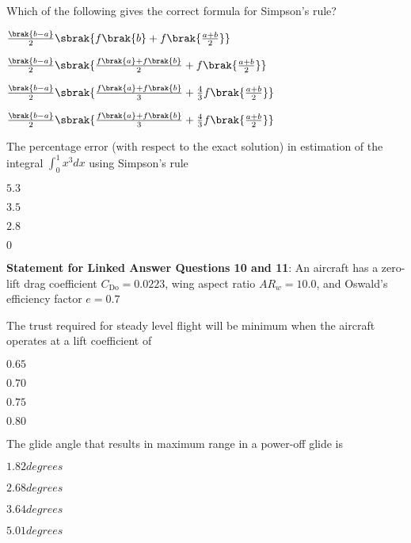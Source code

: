 \item Which of the following gives the correct formula for Simpson's rule?
\begin{enumerate}
\begin{multicols}{2}
\item $ \frac{\brak{ b - a}}{2} \sbrak{ f\brak{b} + f\brak{\frac{a+b}{2}}}$
\item $ \frac{\brak{ b - a}}{2} \sbrak{ \frac{f\brak{a} +f\brak{b}}{2} + f\brak{\frac{a+b}{2}}}$
\item $ \frac{\brak{ b - a}}{2} \sbrak{  \frac{f\brak{a} +f\brak{b}}{3} +\frac{4}{3} f\brak{\frac{a+b}{2}}}$
\item $ \frac{\brak{ b - a}}{2} \sbrak{  \frac{f\brak{a} +f\brak{b}}{3}+ \frac{4}{3}f\brak{\frac{a+b}{2}}}$
 \end{multicols}
\end{enumerate}
\item The percentage error (with respect to the exact solution) in estimation of the integral $\int_{0}^{1} x^{3} dx$ using Simpson's rule 
\begin{enumerate}
\begin{multicols}{4}
    \item $5.3 $
    \item $ 3.5 $
    \item $ 2.8 $
    \item $ 0 $
    \end{multicols}
\end{enumerate}

\item[] \textbf{Statement for Linked Answer Questions 10 and 11}: An aircraft has a zero-lift drag coefficient $C_{\text{Do}} = 0.0223$, wing aspect ratio $AR_{w} = 10.0 $, and Oswald's efficiency factor $e = 0.7$
\item The trust required for steady level flight will be minimum when the aircraft operates at a lift coefficient of 
\begin{enumerate}
\begin{multicols}{4}
    \item $ 0.65 $
    \item $ 0.70$
    \item $ 0.75$
    \item $ 0.80$
    \end{multicols}
\end{enumerate}
 \item The glide angle that results in maximum range in a power-off glide is
\begin{enumerate}
\begin{multicols}{4}
    \item $ 1.82 degrees$
    \item $ 2.68 degrees$
    \item $ 3.64 degrees$
    \item $ 5.01 degrees$
    \end{multicols}
\end{enumerate}

